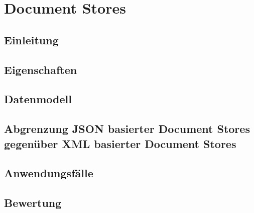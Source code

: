 \section{Document Stores}
\subsection{Einleitung}
\subsection{Eigenschaften}
\subsection{Datenmodell}
\subsection{Abgrenzung JSON basierter Document Stores gegenüber XML basierter Document Stores}
\subsection{Anwendungsfälle}
\subsection{Bewertung}